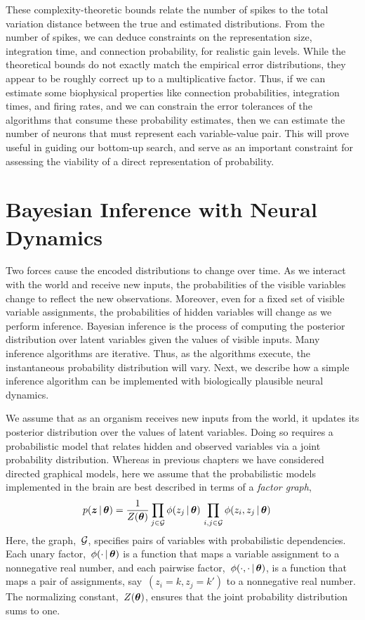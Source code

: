 These complexity-theoretic bounds relate the number of spikes to the 
total variation distance between the true and estimated distributions.
From the number of spikes, we can deduce constraints on the representation
size, integration time, and connection probability, for realistic gain levels.
While the theoretical bounds do not exactly match the empirical error 
distributions, they appear to be roughly correct up to a multiplicative 
factor. Thus, if we can estimate some biophysical properties like 
connection probabilities, integration times, and firing rates, 
and we can constrain the error 
tolerances of the algorithms that consume these probability estimates, 
then we can estimate the number of neurons that must represent 
each variable-value pair. This will prove useful in guiding our 
bottom-up search, and serve as an important constraint for assessing 
the viability of a direct representation of probability.


\section{Bayesian Inference with Neural Dynamics}
\label{sec:inference}
Two forces cause the encoded distributions to change over time. As
we interact with the world and receive new inputs, the probabilities
of the visible variables change to reflect the new
observations. Moreover, even for a fixed set of visible variable
assignments, the probabilities of hidden variables will change as we
perform inference. Bayesian inference is the process of computing the
posterior distribution over latent variables given the values of visible
inputs. Many inference algorithms are iterative. Thus, as the
algorithms execute, the instantaneous probability distribution will
vary. Next, we describe how a simple inference algorithm can be
implemented with biologically plausible neural dynamics.

We assume that as an organism receives new inputs from the world, it
updates its posterior distribution over the values of latent
variables. Doing so requires a probabilistic model that relates hidden
and observed variables via a joint probability distribution.  Whereas
in previous chapters we have considered directed graphical models,
here we assume that the probabilistic models implemented in the brain
are best described in terms of a \emph{factor graph},
\begin{align}
  \label{eq:probabilistic_model}
  p(\boldsymbol{z} \,|\, \boldsymbol{\theta}) &=
  \frac{1}{Z(\boldsymbol{\theta})}
  \prod_{j \in \mathcal{G}} \phi(z_j \,|\, \boldsymbol{\theta}) \,
  \prod_{i,j \in \mathcal{G}} \phi(z_i, z_j \,|\, \boldsymbol{\theta}) \,
\end{align}
Here, the graph,~$\mathcal{G}$, specifies pairs of variables with
probabilistic dependencies.  Each unary factor,~$\phi(\cdot \,|\,
\boldsymbol{\theta})$ is a function that maps a variable assignment to a
nonnegative real number, and each pairwise factor,~$\phi(\cdot, \cdot
\,|\, \boldsymbol{\theta})$, is a function that maps a pair of assignments,
say~${(z_i=k, z_j=k')}$ to a nonnegative real number. The
normalizing constant,~$Z(\boldsymbol{\theta})$, ensures that the joint probability
distribution sums to one.

